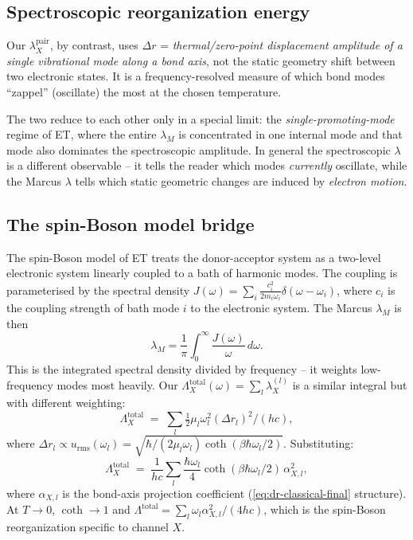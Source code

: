\documentclass[10pt,a4paper,twoside]{article}
\newcommand{\urms}{u_{\mathrm{rms}}}
\begin{document}
\subsection{Spectroscopic reorganization energy}

Our $\lambda_X^\text{pair}$, by contrast, uses $\Delta r$ =
\emph{thermal/zero-point displacement amplitude of a single
vibrational mode along a bond axis}, not the static geometry
shift between two electronic states. It is a frequency-resolved
measure of which bond modes ``zappel'' (oscillate) the most at
the chosen temperature.

The two reduce to each other only in a special limit: the
\emph{single-promoting-mode} regime of ET, where the entire
$\lambda_M$ is concentrated in one internal mode and that mode
also dominates the spectroscopic amplitude. In general the
spectroscopic $\lambda$ is a different observable -- it tells the
reader which modes \emph{currently} oscillate, while the Marcus
$\lambda$ tells which static geometric changes are induced by
\emph{electron motion}.

\subsection{The spin-Boson model bridge}

The spin-Boson model of ET treats the donor-acceptor system as a
two-level electronic system linearly coupled to a bath of harmonic
modes. The coupling is parameterised by the spectral density
$J(\omega) = \sum_i \tfrac{c_i^2}{2 m_i \omega_i} \delta(\omega -
\omega_i)$, where $c_i$ is the coupling strength of bath mode $i$
to the electronic system. The Marcus $\lambda_M$ is then
\begin{equation}
  \lambda_M = \frac{1}{\pi}\int_0^\infty
              \frac{J(\omega)}{\omega}\,d\omega.
\end{equation}
This is the integrated spectral density divided by frequency --
it weights low-frequency modes most heavily. Our
$\Lambda_X^\text{total}(\omega) = \sum_l \lambda_X^{(l)}$ is a
similar integral but with different weighting:
\begin{equation}
  \Lambda_X^\text{total}
   \;=\; \sum_l \tfrac{1}{2}\mu_l\omega_l^2 (\Delta r_l)^2 / (hc),
\end{equation}
where $\Delta r_l \propto \urms(\omega_l) = \sqrt{\hbar/(2\mu_l
\omega_l)\coth(\beta\hbar\omega_l/2)}$. Substituting:
\begin{equation}
  \Lambda_X^\text{total}
   \;=\; \frac{1}{hc} \sum_l
         \frac{\hbar \omega_l}{4}
         \coth(\beta\hbar\omega_l/2)\,\alpha_{X,l}^2,
\end{equation}
where $\alpha_{X,l}$ is the bond-axis projection coefficient
(\cref{eq:dr-classical-final} structure). At $T \to 0$,
$\coth \to 1$ and $\Lambda^\text{total} = \sum_l \omega_l
\alpha_{X,l}^2 / (4 hc)$, which is the spin-Boson reorganization
specific to channel $X$.
\end{document}
